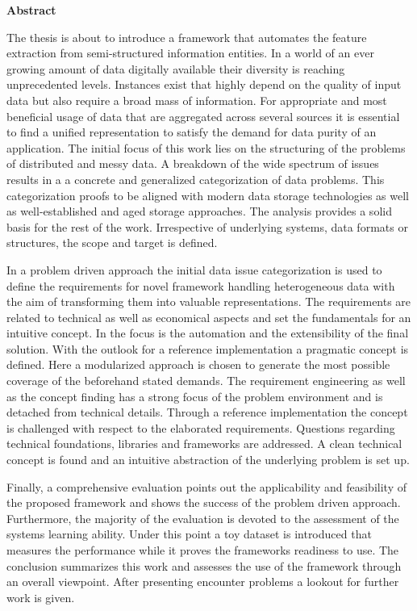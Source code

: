 \thispagestyle{empty}
\vspace*{1.0cm}

\begin{center}
    \textbf{Abstract}
\end{center}

\vspace*{0.5cm}

\noindent
The thesis is about to introduce a framework that automates the feature extraction from semi-structured information entities. In a world of an ever growing amount of data digitally available their diversity is reaching unprecedented levels. Instances exist that highly depend on the quality of input data but also require a broad mass of information. For appropriate and most beneficial usage of data that are aggregated across several sources it is essential to find a unified representation to satisfy the demand for data purity of an application. The initial focus of this work lies on the structuring of the problems of distributed and messy data. A breakdown of the wide spectrum of issues results in a a concrete and generalized categorization of data problems.  This categorization proofs to be aligned with modern data storage technologies as well as well-established and aged storage approaches. The analysis provides a solid basis for the rest of the work. Irrespective of underlying systems, data formats or structures, the scope and target is defined. 

In a problem driven approach the initial data issue categorization is used to define the requirements for novel framework handling heterogeneous data with the aim of transforming them into valuable representations. The requirements are related to technical as well as economical aspects and set the fundamentals for an intuitive concept. In the focus is the automation and the extensibility of the final solution. With the outlook for a reference implementation a pragmatic concept is defined. Here a modularized approach is chosen to generate the most possible coverage of the beforehand stated demands. The requirement engineering as well as the concept finding has a strong focus of the problem environment and is detached from technical details. Through a reference implementation the concept is challenged with respect to the elaborated requirements. Questions regarding technical foundations, libraries and frameworks are addressed. A clean technical concept is found and an intuitive abstraction of the underlying problem is set up. 

Finally, a comprehensive evaluation points out the applicability and feasibility of the proposed framework and shows the success of the problem driven approach. Furthermore, the majority of the evaluation is devoted to the assessment of the systems learning ability. Under this point a toy dataset is introduced that measures the performance while it proves the frameworks readiness to use. The conclusion summarizes this work and assesses the use of the framework through an overall viewpoint. After presenting encounter problems a lookout for further work is given.
